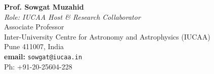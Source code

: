 \item
\begin{minipage}[t]{0.48\textwidth}
\textbf{Prof. Sowgat Muzahid} \\
\textit{Role: IUCAA Host \& Research Collaborator} \\
Associate Professor \\
Inter-University Centre for Astronomy and Astrophysics (IUCAA) \\
Pune 411007, India \\
\textbf{email: }\texttt{sowgat@iucaa.in} \\
Ph: +91-20-25604-228
\end{minipage}


